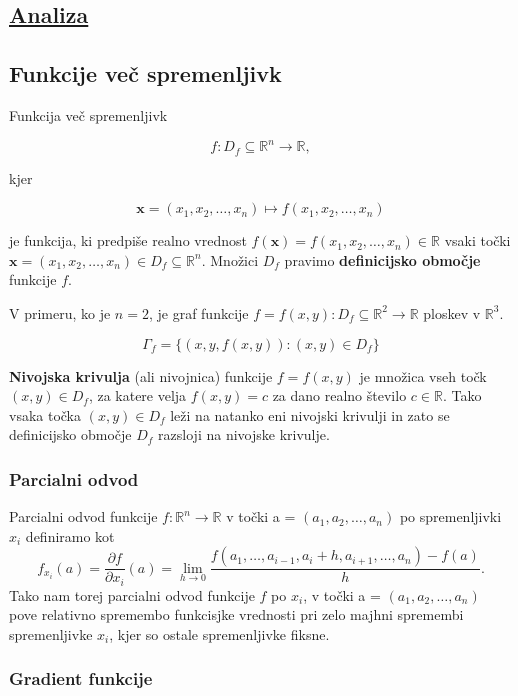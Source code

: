 \documentclass{article}
\begin{document}
\begin{multicols}{2}
	\section{\underline{Analiza}}

	\subsection{Funkcije več spremenljivk}
	Funkcija več spremenljivk

	\[
		f : D_f \subseteq \mathbb{R}^n \to \mathbb{R},
	\]

	kjer

	\[
		\mathbf{x} = (x_1, x_2, \ldots, x_n) \mapsto f(x_1, x_2, \ldots, x_n)
	\]

	je funkcija, ki predpiše realno vrednost $f(\mathbf{x}) = f(x_1, x_2, \ldots, x_n) \in \mathbb{R}$ vsaki točki $\mathbf{x} = (x_1, x_2, \ldots, x_n) \in D_f \subseteq \mathbb{R}^n$. Množici $D_f$ pravimo \textbf{definicijsko območje} funkcije $f$.

	V primeru, ko je $n = 2$, je graf funkcije $f = f(x, y): D_f \subseteq \mathbb{R}^2 \to \mathbb{R}$ ploskev v $\mathbb{R}^3$.

	\[
		\Gamma_f = \{ (x, y, f(x, y)) : (x, y) \in D_f \}
	\]

	\textbf{Nivojska krivulja} (ali nivojnica) funkcije $f = f(x, y)$ je množica vseh točk $(x, y) \in D_f$, za katere velja $f(x, y) = c$ za dano realno število $c \in \mathbb{R}$. Tako vsaka točka $(x, y) \in D_f$ leži na natanko eni nivojski krivulji in zato se definicijsko območje $D_f$ razsloji na nivojske krivulje.

	\subsubsection{Parcialni odvod}
	Parcialni odvod funkcije \( f: \mathbb{R}^n \rightarrow \mathbb{R} \) v točki a = \( (a_1, a_2, \ldots, a_n) \) po spremenljivki \( x_i \) definiramo kot
	\[
		f_{x_i}(a) = \frac{\partial f}{\partial x_i}(a) = \lim_{h \to 0} \frac{f(a_1, \ldots, a_{i-1}, a_i + h, a_{i+1}, \ldots, a_n) - f(a)}{h}.
	\]
	Tako nam torej parcialni odvod funkcije \( f \) po \( x_i \), v točki a = \( (a_1, a_2, \ldots, a_n) \) pove relativno spremembo funkcisjke vrednosti pri zelo majhni spremembi spremenljivke \( x_i \), kjer so ostale spremenljivke fiksne.


	\subsubsection{Gradient funkcije}


\end{multicols}
\end{document}

